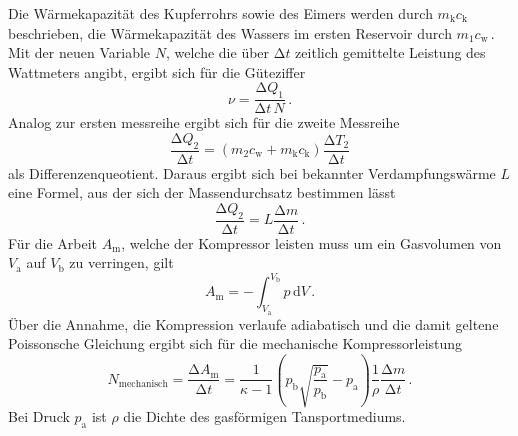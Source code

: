Die Wärmekapazität des Kupferrohrs sowie des Eimers werden durch $m_\text{k}c_\text{k}$ beschrieben,
die Wärmekapazität des Wassers im ersten Reservoir durch $m_1c_\text{w}$\,.
Mit der neuen Variable $N$, welche die über $\increment t$ zeitlich gemittelte Leistung des 
Wattmeters angibt, ergibt sich für die Güteziffer 
\begin{equation}
    \nu=\frac{\increment Q_1}{\increment t\,N}\,.
    \label{eq:Guetereal}
\end{equation}
Analog zur ersten messreihe ergibt sich für die zweite Messreihe
\begin{equation}
    \frac{\increment Q_2}{\increment t}=(m_2c_\text{w}+m_\text{k}c_\text{k})\frac{\increment T_2}{\increment t}
\end{equation}
als Differenzenqueotient. Daraus ergibt sich bei bekannter Verdampfungswärme $L$ eine Formel,
aus der sich der Massendurchsatz bestimmen lässt
\begin{equation}
    \frac{\increment Q_2}{\increment t}=L\frac{\increment m}{\increment t}\,.
    \label{eq:massendurchsatz}
\end{equation}
Für die Arbeit $A_\text{m}$, welche der Kompressor leisten muss um ein Gasvolumen von $V_\text{a}$
auf $V_\text{b}$ zu verringen, gilt 
\begin{equation}
    A_\text{m}=-\int_{V_\text{a}}^{V_\text{b}}p \,\text{d} V\,.
\end{equation}
Über die Annahme, die Kompression verlaufe adiabatisch und die damit geltene Poissonsche Gleichung
ergibt sich für die mechanische Kompressorleistung
\begin{equation}
N_\text{mechanisch}=\frac{\increment A_\text{m}}{\increment t}=\frac{1}{\kappa-1}\left(p_\text{b}
\sqrt{\frac{p_\text{a}}{p_\text{b}}}-p_\text{a}\right)\frac{1}{\rho}\frac{\increment m}{\increment t}\,.
\label{eq:mechanisch}
\end{equation}
Bei Druck $p_\text{a}$ ist $\rho$ die Dichte des gasförmigen Tansportmediums.

